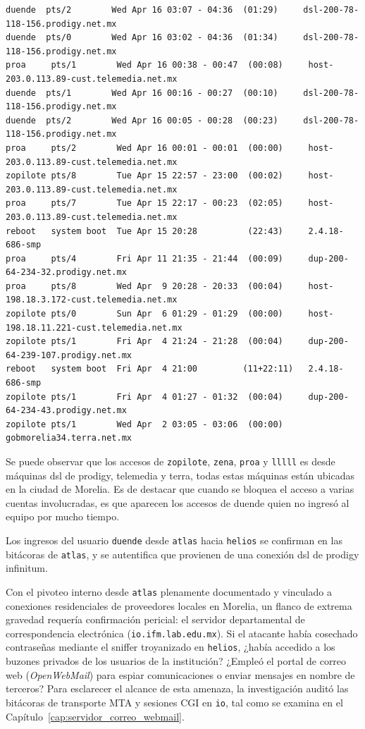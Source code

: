 \begin{lstlisting}[style=terminal]
duende  pts/2        Wed Apr 16 03:07 - 04:36  (01:29)     dsl-200-78-118-156.prodigy.net.mx
duende  pts/0        Wed Apr 16 03:02 - 04:36  (01:34)     dsl-200-78-118-156.prodigy.net.mx
proa     pts/1        Wed Apr 16 00:38 - 00:47  (00:08)     host-203.0.113.89-cust.telemedia.net.mx
duende  pts/1        Wed Apr 16 00:16 - 00:27  (00:10)     dsl-200-78-118-156.prodigy.net.mx
duende  pts/2        Wed Apr 16 00:05 - 00:28  (00:23)     dsl-200-78-118-156.prodigy.net.mx
proa     pts/2        Wed Apr 16 00:01 - 00:01  (00:00)     host-203.0.113.89-cust.telemedia.net.mx
zopilote pts/8        Tue Apr 15 22:57 - 23:00  (00:02)     host-203.0.113.89-cust.telemedia.net.mx
proa     pts/7        Tue Apr 15 22:17 - 00:23  (02:05)     host-203.0.113.89-cust.telemedia.net.mx
reboot   system boot  Tue Apr 15 20:28          (22:43)     2.4.18-686-smp
proa     pts/4        Fri Apr 11 21:35 - 21:44  (00:09)     dup-200-64-234-32.prodigy.net.mx
proa     pts/8        Wed Apr  9 20:28 - 20:33  (00:04)     host-198.18.3.172-cust.telemedia.net.mx
zopilote pts/0        Sun Apr  6 01:29 - 01:29  (00:00)     host-198.18.11.221-cust.telemedia.net.mx
zopilote pts/1        Fri Apr  4 21:24 - 21:28  (00:04)     dup-200-64-239-107.prodigy.net.mx
reboot   system boot  Fri Apr  4 21:00         (11+22:11)   2.4.18-686-smp
zopilote pts/1        Fri Apr  4 01:27 - 01:32  (00:04)     dup-200-64-234-43.prodigy.net.mx
zopilote pts/1        Wed Apr  2 03:05 - 03:06  (00:00)     gobmorelia34.terra.net.mx
\end{lstlisting}

\vspace{1em}

 Se puede observar que los accesos de \texttt{zopilote}, \texttt{zena}, \texttt{proa} y \texttt{lllll}
es desde máquinas dsl de prodigy, telemedia y terra, todas estas
máquinas están ubicadas en la ciudad de Morelia. Es de destacar que
cuando se bloquea el acceso a varias cuentas involucradas, es que
aparecen los accesos de duende quien no ingresó al equipo por mucho tiempo.

 Los ingresos del usuario \texttt{duende} desde \texttt{atlas} hacia \texttt{helios} se
confirman en las bitácoras de \texttt{atlas}, y se autentifica que provienen de
una conexión dsl de prodigy infinitum.

Con el pivoteo interno desde \texttt{atlas} plenamente documentado y vinculado a conexiones residenciales de proveedores locales en Morelia, un flanco de extrema gravedad requería confirmación pericial: el servidor departamental de correspondencia electrónica (\texttt{io.ifm.lab.edu.mx}). Si el atacante había cosechado contraseñas mediante el sniffer troyanizado en \texttt{helios}, ¿había accedido a los buzones privados de los usuarios de la institución? ¿Empleó el portal de correo web (\textit{OpenWebMail}) para espiar comunicaciones o enviar mensajes en nombre de terceros? Para esclarecer el alcance de esta amenaza, la investigación auditó las bitácoras de transporte MTA y sesiones CGI en \texttt{io}, tal como se examina en el Capítulo~\ref{cap:servidor_correo_webmail}.

